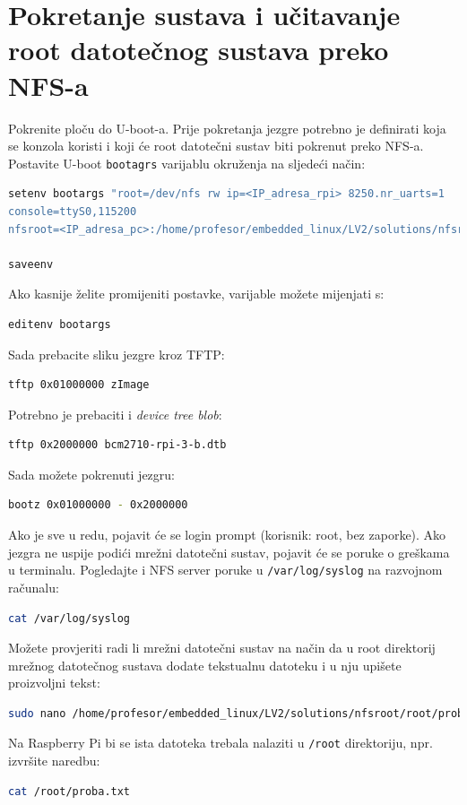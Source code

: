 \documentclass[11pt]{article}
\begin{document}
\section{Pokretanje sustava i učitavanje root datotečnog sustava preko NFS-a}
Pokrenite ploču do U-boot-a. Prije pokretanja jezgre potrebno je definirati
 koja se konzola koristi i koji će root datotečni sustav biti pokrenut preko
 NFS-a. Postavite U-boot \texttt{bootagrs} varijablu okruženja na sljedeći
 način:
\begin{lstlisting}[language=bash]
setenv bootargs "root=/dev/nfs rw ip=<IP_adresa_rpi> 8250.nr_uarts=1
console=ttyS0,115200
nfsroot=<IP_adresa_pc>:/home/profesor/embedded_linux/LV2/solutions/nfsroot"

saveenv
\end{lstlisting}
Ako kasnije želite promijeniti postavke, varijable možete mijenjati s:
\begin{lstlisting}[language=bash]
editenv bootargs
\end{lstlisting}
Sada prebacite sliku jezgre kroz TFTP:
\begin{lstlisting}[language=bash]
tftp 0x01000000 zImage
\end{lstlisting}
Potrebno je prebaciti i \textit{device tree blob}:
\begin{lstlisting}[language=bash]
tftp 0x2000000 bcm2710-rpi-3-b.dtb
\end{lstlisting}
Sada možete pokrenuti jezgru:
\begin{lstlisting}[language=bash]
bootz 0x01000000 - 0x2000000
\end{lstlisting}
Ako je sve u redu, pojavit će se login prompt (korisnik: root, bez zaporke).
 Ako jezgra ne uspije podići mrežni datotečni sustav, pojavit će se poruke o
 greškama u terminalu. Pogledajte i NFS server poruke u \texttt{/var/log/syslog}
 na razvojnom računalu:
\begin{lstlisting}[language=bash]
cat /var/log/syslog
\end{lstlisting}
Možete provjeriti radi li mrežni datotečni sustav na način da u root direktorij
 mrežnog datotečnog sustava dodate tekstualnu datoteku i u nju upišete
 proizvoljni tekst:
\begin{lstlisting}[language=bash]
sudo nano /home/profesor/embedded_linux/LV2/solutions/nfsroot/root/proba.txt
\end{lstlisting}
Na Raspberry Pi bi se ista datoteka trebala nalaziti u \texttt{/root}
 direktoriju, npr. izvršite naredbu:
\begin{lstlisting}[language=bash]
cat /root/proba.txt
\end{lstlisting}
\end{document}

